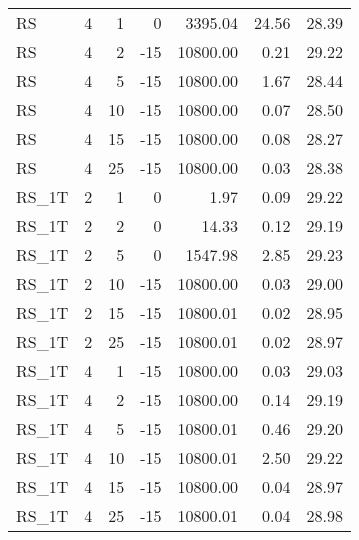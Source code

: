 \begin{center}
\begin{longtable}{lrrrrrr}
  RS     & 4 & 1 &   0 & 3395.04 & 24.56 & 28.39 \\ 
  RS     & 4 & 2 & -15 & 10800.00 & 0.21 & 29.22 \\ 
  RS     & 4 & 5 & -15 & 10800.00 & 1.67 & 28.44 \\ 
  RS     & 4 & 10 & -15 & 10800.00 & 0.07 & 28.50 \\ 
  RS     & 4 & 15 & -15 & 10800.00 & 0.08 & 28.27 \\ 
  RS     & 4 & 25 & -15 & 10800.00 & 0.03 & 28.38 \\ 
  RS\_1T     & 2 & 1 &   0 & 1.97 & 0.09 & 29.22 \\ 
  RS\_1T     & 2 & 2 &   0 & 14.33 & 0.12 & 29.19 \\ 
  RS\_1T     & 2 & 5 &   0 & 1547.98 & 2.85 & 29.23 \\ 
  RS\_1T     & 2 & 10 & -15 & 10800.00 & 0.03 & 29.00 \\ 
  RS\_1T     & 2 & 15 & -15 & 10800.01 & 0.02 & 28.95 \\ 
  RS\_1T     & 2 & 25 & -15 & 10800.01 & 0.02 & 28.97 \\ 
  RS\_1T     & 4 & 1 & -15 & 10800.00 & 0.03 & 29.03 \\ 
  RS\_1T     & 4 & 2 & -15 & 10800.00 & 0.14 & 29.19 \\ 
  RS\_1T     & 4 & 5 & -15 & 10800.01 & 0.46 & 29.20 \\ 
  RS\_1T     & 4 & 10 & -15 & 10800.01 & 2.50 & 29.22 \\ 
  RS\_1T     & 4 & 15 & -15 & 10800.00 & 0.04 & 28.97 \\ 
  RS\_1T     & 4 & 25 & -15 & 10800.01 & 0.04 & 28.98 \\ 
\end{longtable}
\end{center}
